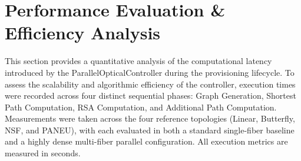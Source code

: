 \section{Performance Evaluation \& Efficiency Analysis}
This section provides a quantitative analysis of the computational latency introduced by the ParallelOpticalController during the provisioning lifecycle. To assess the scalability and algorithmic efficiency of the controller, execution times were recorded across four distinct sequential phases: Graph Generation, Shortest Path Computation, RSA Computation, and Additional Path Computation. Measurements were taken across the four reference topologies (Linear, Butterfly, NSF, and PANEU), with each evaluated in both a standard single-fiber baseline and a highly dense multi-fiber parallel configuration. All execution metrics are measured in seconds.
\begin{table}[htbp]
    \centering
    \caption{Efficiency evaluation of ParallelOpticalController}
    \label{tab:complexity_analysis_table}
\end{table}

